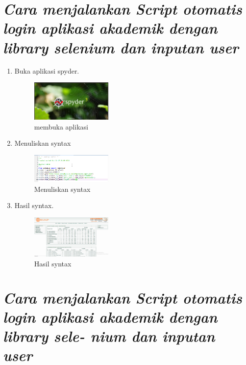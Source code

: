 \begin{enumerate}
\begin{enumerate}
\end{enumerate}

\section*{\textit{Cara menjalankan Script otomatis login aplikasi akademik dengan library selenium dan inputan user}}

\begin{enumerate}

\item Buka aplikasi spyder.
\begin{figure}[hb]
\includegraphics[width=4cm]{figure/pemakaian1.png}
\centering
\caption{membuka aplikasi}
\end{figure}

\item Menuliskan syntax 
\begin{figure}[hb]
\includegraphics[width=4cm]{figure/login.png}
\centering
\caption{Menuliskan syntax}
\end{figure}

\item Hasil syntax.
\begin{figure}[hb]
\includegraphics[width=4cm]{figure/login1.png}
\centering
\caption{Hasil syntax}
\end{figure}

\end{enumerate}


\section*{\textit{ Cara menjalankan Script otomatis login aplikasi akademik dengan library sele-
nium dan inputan user }}

\begin{enumerate}


\end{enumerate}
\end{enumerate}
